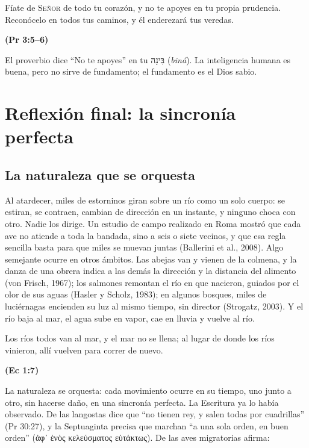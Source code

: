 \documentclass[11pt,letterpaper]{article}
\newcommand{\heb}[1]{\mbox{\foreignlanguage{hebrew}{#1}}}
\newcommand{\grc}[1]{\foreignlanguage{ancientgreek}{#1}}
\newcommand{\SENOR}{\textsc{Señor}}
\newcommand{\fuente}[1]{\par\hfill{\upshape\bfseries\small\textcolor{azul}{#1}}}
\begin{document}
\begin{cita}Fíate de \SENOR{} de todo tu corazón, y no te apoyes en tu propia prudencia. Reconócelo en todos tus caminos, y él enderezará tus veredas.\fuente{(Pr 3:5--6)}\end{cita}

El proverbio dice ``No te apoyes'' en tu \heb{בִּינָה} (\emph{biná}). La inteligencia humana es buena, pero no sirve de fundamento; el fundamento es el Dios sabio.

\section{Reflexión final: la sincronía perfecta}

\subsection{La naturaleza que se orquesta}

Al atardecer, miles de estorninos giran sobre un río como un solo cuerpo: se estiran, se contraen, cambian de dirección en un instante, y ninguno choca con otro. Nadie los dirige. Un estudio de campo realizado en Roma mostró que cada ave no atiende a toda la bandada, sino a seis o siete vecinos, y que esa regla sencilla basta para que miles se muevan juntas (Ballerini et al., 2008). Algo semejante ocurre en otros ámbitos. Las abejas van y vienen de la colmena, y la danza de una obrera indica a las demás la dirección y la distancia del alimento (von Frisch, 1967); los salmones remontan el río en que nacieron, guiados por el olor de sus aguas (Hasler y Scholz, 1983); en algunos bosques, miles de luciérnagas encienden su luz al mismo tiempo, sin director (Strogatz, 2003). Y el río baja al mar, el agua sube en vapor, cae en lluvia y vuelve al río.

\begin{cita}Los ríos todos van al mar, y el mar no se llena; al lugar de donde los ríos vinieron, allí vuelven para correr de nuevo.\fuente{(Ec 1:7)}\end{cita}

La naturaleza se orquesta: cada movimiento ocurre en su tiempo, uno junto a otro, sin hacerse daño, en una sincronía perfecta. La Escritura ya lo había observado. De las langostas dice que ``no tienen rey, y salen todas por cuadrillas'' (Pr 30:27), y la Septuaginta precisa que marchan ``a una sola orden, en buen orden'' (\grc{ἀφ᾽ ἑνὸς κελεύσματος εὐτάκτως}). De las aves migratorias afirma:
\end{document}
